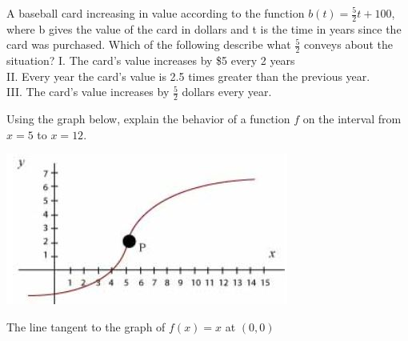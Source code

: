 \documentclass{ximera}
\newcommand{\recommendation}[1]{}
\newcommand{\GoodQuestions}[1]{}
\newcommand{\PCA}[1]{}
\begin{document}
\begin{problem}
  \recommendation{Elizabeth}
  \PCA{\#22}

  A baseball card increasing in value according to the function
  $b(t)=\frac{5}{2}t+100$, where b gives the value of the card in
  dollars and t is the time in years since the card was purchased.
  Which of the following describe what $\frac{5}{2}$ conveys about the
  situation?
  I. The card's value increases by \$5 every 2 years\\
  II. Every year the card's value is 2.5 times greater than the previous year.\\
  III.  The card's value increases by $\frac{5}{2}$ dollars every year.
  \begin{multipleChoice}
  \end{multipleChoice}
\end{problem}


\begin{problem}
  \recommendation{Elizabeth}

  \PCA{\#19}

  Using the graph below, explain the behavior of a function $f$ on the
  interval from $x=5$ to $x=12$.
  \begin{image}
    \includegraphics[scale = 1]{rategraph.jpg}
  \end{image}
  \begin{multipleChoice}
  \end{multipleChoice}
\end{problem}


\begin{problem}
  \recommendation{Vic}
  \GoodQuestions{Subject: Tangents, velocities, and other rates of change 2P}
  The line tangent to the graph of $f(x)=x$ at $(0,0)$
  \begin{multipleChoice}
  \end{multipleChoice}
\end{problem}
\end{document}
